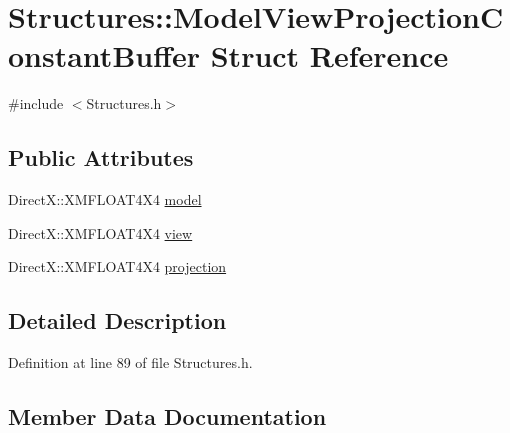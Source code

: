 \hypertarget{struct_structures_1_1_model_view_projection_constant_buffer}{}\section{Structures\+:\+:Model\+View\+Projection\+Constant\+Buffer Struct Reference}
\label{struct_structures_1_1_model_view_projection_constant_buffer}


{\ttfamily \#include $<$Structures.\+h$>$}

\subsection*{Public Attributes}
\begin{DoxyCompactItemize}
\item 
Direct\+X\+::\+X\+M\+F\+L\+O\+A\+T4\+X4 \mbox{\hyperlink{struct_structures_1_1_model_view_projection_constant_buffer_adcf32ccfcc0913db019de696791d6333}{model}}
\item 
Direct\+X\+::\+X\+M\+F\+L\+O\+A\+T4\+X4 \mbox{\hyperlink{struct_structures_1_1_model_view_projection_constant_buffer_aede4441ba5f179e090eb088d735ffd34}{view}}
\item 
Direct\+X\+::\+X\+M\+F\+L\+O\+A\+T4\+X4 \mbox{\hyperlink{struct_structures_1_1_model_view_projection_constant_buffer_a515d9a03f96f1d6d35a0713b6fef0386}{projection}}
\end{DoxyCompactItemize}


\subsection{Detailed Description}


Definition at line 89 of file Structures.\+h.



\subsection{Member Data Documentation}
\mbox{\label{struct_structures_1_1_model_view_projection_constant_buffer_adcf32ccfcc0913db019de696791d6333}} 
